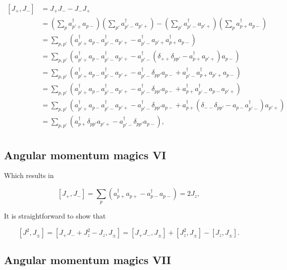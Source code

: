 \documentclass[11pt]{article}
\begin{document}
    \[
\begin{align*}
[J_+,J_-] &= J_+ J_- - J_- J_+ \\
&= \left( \sum_p a_{p'+}^\dagger a_{p-} \right)
\left( \sum_{p'} a_{p'-}^\dagger a_{p'+} \right) -
\left( \sum_{p'} a_{p'-}^\dagger a_{p'+} \right)
\left( \sum_p a_{p+}^\dagger a_{p-} \right) \\
&= \sum_{p,p'} \left(
a_{p'+}^\dagger a_{p-} a_{p'-}^\dagger a_{p'+} -
a_{p'-}^\dagger a_{p'+} a_{p+}^\dagger a_{p-} \right) \\
&= \sum_{p,p'} \left(
a_{p'+}^\dagger a_{p-} a_{p'-}^\dagger a_{p'+} -
a_{p'-}^\dagger \left( \delta_{++} \delta_{pp'} -
a_{p+}^\dagger a_{p'+} \right) a_{p-} \right) \\
&= \sum_{p,p'} \left(
a_{p'+}^\dagger a_{p-} a_{p'-}^\dagger a_{p'+} -
a_{p'-}^\dagger \delta_{pp'} a_{p-} +
a_{p'-}^\dagger a_{p+}^\dagger a_{p'+} a_{p-} \right) \\
&= \sum_{p,p'} \left(
a_{p'+}^\dagger a_{p-} a_{p'-}^\dagger a_{p'+} -
a_{p'-}^\dagger \delta_{pp'} a_{p-} +
a_{p+}^\dagger a_{p'-}^\dagger a_{p-} a_{p'+} \right) \\
&= \sum_{p,p'} \left(
a_{p'+}^\dagger a_{p-} a_{p'-}^\dagger a_{p'+} -
a_{p'-}^\dagger \delta_{pp'} a_{p-} +
a_{p+}^\dagger \left( \delta_{--} \delta_{pp'} -
a_{p-} a_{p'-}^\dagger \right) a_{p'+} \right) \\
&= \sum_{p,p'} \left(
a_{p+}^\dagger \delta_{pp'} a_{p'+} -
a_{p'-}^\dagger \delta_{pp'} a_{p-} \right), \\
\end{align*}
\]

    \hypertarget{angular-momentum-magics-vi}{%
\subsection{Angular momentum magics
VI}\label{angular-momentum-magics-vi}}

Which results in

    \[
[J_+,J_-] = \sum_p \left(
a_{p+}^\dagger a_{p+} -
a_{p-}^\dagger a_{p-} \right) = 2J_z,
\]

    It is straightforward to show that

    \[
[J^2, J_\pm] = [J_+ J_- + J_z^2 - J_z, J_\pm] =
[J_+ J_-, J_\pm] + [J_z^2, J_\pm] - [J_z, J_\pm].
\]

    \hypertarget{angular-momentum-magics-vii}{%
\subsection{Angular momentum magics
VII}\label{angular-momentum-magics-vii}}
\end{document}
